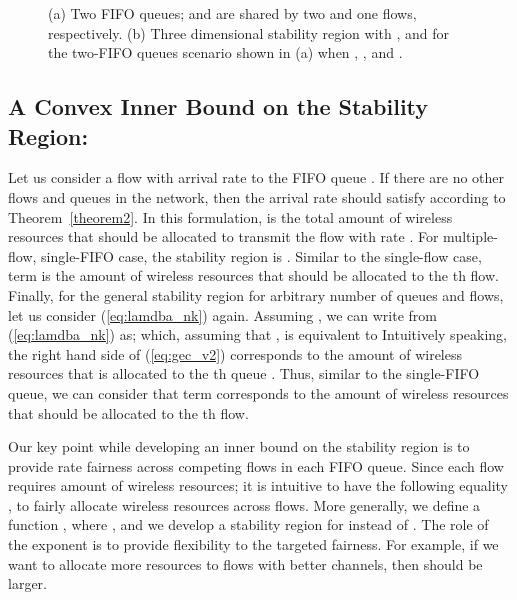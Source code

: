 \documentclass[conference]{IEEEtran}
\begin{document}
\begin{figure}
\vspace{-10pt}
\centering
{}
\vspace{-5pt}
\caption{(a) Two FIFO queues;  and  are shared by two and one flows, respectively. (b) Three dimensional stability region with ,  and  for the two-FIFO queues scenario shown in (a) when , , and .}
\label{fig:two_queue}
\vspace{-15pt}
\end{figure}


\subsection{A Convex Inner Bound on the Stability Region:} \label{sec:stability_single_innerBound}
Let us consider a flow with arrival rate  to the FIFO queue . If there are no other flows and queues in the network, then the arrival rate should satisfy  according to Theorem~\ref{theorem2}. In this formulation,  is the total amount of wireless resources that should be allocated to transmit  the flow with rate . For multiple-flow, single-FIFO case, the stability region is . Similar to the single-flow case,  term is the amount of wireless resources that should be allocated to the th flow. Finally, for the general stability region for arbitrary number of queues and flows, let us consider (\ref{eq:lamdba_nk}) again. Assuming , we can write  from (\ref{eq:lamdba_nk}) as;
 which, assuming that ,  is equivalent to
 Intuitively speaking, the right hand side of (\ref{eq:gec_v2}) corresponds to the amount of wireless resources that is allocated to the th queue . Thus, similar to the single-FIFO queue, we can consider that  term corresponds to the amount of wireless resources that should be allocated to the th flow.


Our key point while developing an inner bound on the stability region is to provide rate fairness across competing flows in each FIFO queue. Since each flow requires  amount of wireless resources; it is intuitive to have the following equality ,  to fairly allocate wireless resources across flows. More generally, we define a function ,  where , and we develop a stability region for  instead of . The role of the exponent  is to provide  flexibility to the targeted fairness. For example, if we want to allocate more resources to flows with better channels, then  should be larger. 
\end{document}
